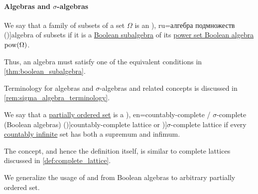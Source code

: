 \paragraph{Algebras and \( \sigma \)-algebras}

\begin{definition}\label{def:algebra_of_subsets}
  We say that a family of subsets of a set \( \Omega \) is an \term[bg=булева алгебра (\cite[def. 3.1]{Драганов2022ТеорияНаМярката}), ru=алгебра подмножеств (\cite[def. II.1.1]{Ширяев2007ВероятностьТом1})]{algebra of subsets} if it is a \hyperref[def:boolean_algebra/submodel]{Boolean subalgebra} of its \hyperref[thm:boolean_algebra_of_subsets]{power set Boolean algebra} \( \operatorname{pow}(\Omega) \).
\end{definition}
\begin{comments}
  \item Thus, an algebra must satisfy one of the equivalent conditions in \cref{thm:boolean_subalgebra}.
  \item Terminology for algebras and \( \sigma \)-algebras and related concepts is discussed in \cref{rem:sigma_algebra_terminology}.
\end{comments}

\begin{definition}\label{def:countably_complete_lattice}\mimprovised
  We say that a \hyperref[def:partially_ordered_set]{partially ordered set} is a \term[ru=(Булева алгебра) счётного типа (\cite[\S 1.6.3]{Владимиров1969БулевыАлгебры}), en=countably-complete / \( \sigma \)-complete (Boolean algebras) (\cite[244]{HalmosGivant2009BooleanAlgebras})]{countably-complete lattice} or \term[en=\( \sigma \)-complete (Boolean algebras) (\cite[244]{HalmosGivant2009BooleanAlgebras})]{\( \sigma \)-complete lattice} if every \hyperref[def:set_countability/countably_infinite]{countably infinite} set has both a supremum and infimum.
\end{definition}
\begin{comments}
  \item The concept, and hence the definition itself, is similar to complete lattices discussed in \cref{def:complete_lattice}.
  \item We generalize the usage of \cite[\S 1.6.3]{Владимиров1969БулевыАлгебры} and \cite[244]{HalmosGivant2009BooleanAlgebras} from Boolean algebras to arbitrary partially ordered set.
\end{comments}

